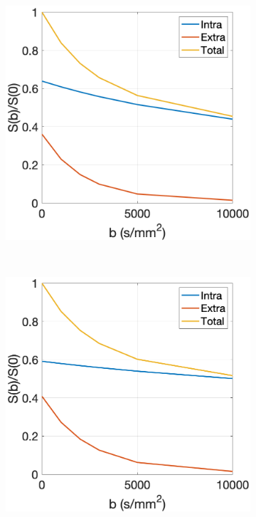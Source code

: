 \begin{figure}
  \centering
  \begin{subfigure}[]{0.4\textwidth}
    \includegraphics[width=\textwidth]{figures/frf_experiment/in_ex_tot_Kappa_2.png}
    \caption{}
  \end{subfigure}
  ~
  \begin{subfigure}[]{0.4\textwidth}
    \includegraphics[width=\textwidth]{figures/frf_experiment/in_ex_tot_Kappa_6.png}
    \caption{}
  \end{subfigure}


\end{figure}
